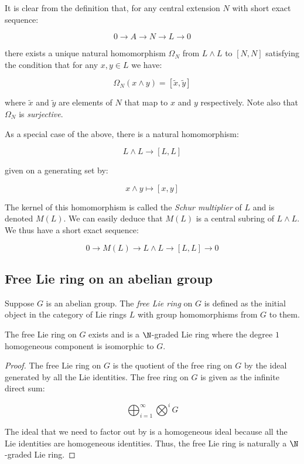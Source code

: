 \documentclass{ucetd}
\begin{document}
It is clear from the definition that, for any central
extension $N$ with short exact sequence:

$$0 \to A \to N \to L \to 0$$

there exists a unique natural homomorphism $\Omega_N$ from $L \wedge L$ to
$[N,N]$ satisfying the condition that for any $x,y \in L$ we have:

$$\Omega_N(x \wedge y) = [\tilde{x},\tilde{y}]$$

where $\tilde{x}$ and $\tilde{y}$ are elements of $N$ that map to $x$
and $y$ respectively. Note also that $\Omega_N$ is {\em surjective}.

As a special case of the above, there is a natural homomorphism:

$$L \wedge L \to [L,L]$$

given on a generating set by:

$$x \wedge y \mapsto [x,y]$$

The kernel of this homomorphism is called the {\em Schur multiplier}
of $L$ and is denoted $M(L)$. We can easily deduce that $M(L)$ is a
central subring of $L \wedge L$. We thus have a short exact sequence:

$$0 \to M(L) \to L \wedge L \to [L,L] \to 0$$

\subsection{Free Lie ring on an abelian group}\label{sec:free-lie-ring-on-abelian-group}

Suppose $G$ is an abelian group. The {\em free Lie ring} on $G$ is
defined as the initial object in the category of Lie rings $L$ with
group homomorphisms from $G$ to them.

\begin{lemma}
  The free Lie ring on $G$ exists and is a $\N$-graded Lie ring where
  the degree $1$ homogeneous component is isomorphic to $G$.
\end{lemma}

\begin{proof}
  The free Lie ring on $G$ is the quotient of the free ring on $G$ by
  the ideal generated by all the Lie identities. The free ring on $G$
  is given as the infinite direct sum:

  $$\bigoplus_{i=1}^\infty \bigotimes^iG$$

  The ideal that we need to factor out by is a homogeneous ideal
  because all the Lie identities are homogeneous identities. Thus, the
  free Lie ring is naturally a $\N$-graded Lie ring.
\end{proof}
\end{document}

